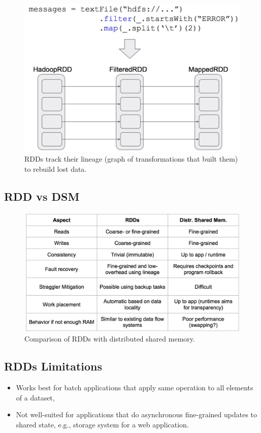 \begin{frame}
\begin{figure}
\centering
\includegraphics[width=0.7\linewidth]{figures/fault-tolerance.jpg}
\caption{RDDs track their lineage (graph of transformations that built them) to
rebuild lost data.}
\end{figure}
\end{frame}

\subsection{RDD vs DSM}
\begin{frame}
\begin{figure}
\centering
\includegraphics[width=0.9\linewidth]{figures/rdd-vs-dsm.jpg}
\caption{Comparison of RDDs with distributed shared memory.}
\end{figure}
\end{frame}

\subsection{RDDs Limitations}
\begin{frame}
\begin{itemize}
  \item Works best for batch applications that apply same operation to all
  elements of a dataset,
  \item Not well-suited for applications that do asynchronous fine-grained
  updates to shared state, e.g., storage system for a web application.
\end{itemize}
\end{frame}

